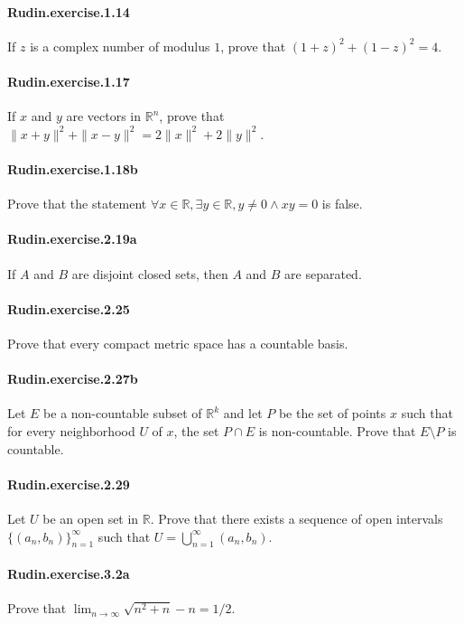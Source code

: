 \documentclass{article}
\begin{document}
\paragraph{Rudin.exercise.1.14} If $z$ is a complex number of modulus $1$, prove that $(1+z)^2+(1-z)^2=4$.

\paragraph{Rudin.exercise.1.17} If $x$ and $y$ are vectors in $\mathbb{R}^n$, prove that $\|x+y\|^2 + \|x-y\|^2 = 2\|x\|^2 + 2\|y\|^2$.

\paragraph{Rudin.exercise.1.18b} Prove that the statement $\forall x\in\mathbb{R}, \exists y\in\mathbb{R}, y\neq 0 \land xy=0$ is false.

\paragraph{Rudin.exercise.2.19a} If $A$ and $B$ are disjoint closed sets, then $A$ and $B$ are separated.

\paragraph{Rudin.exercise.2.25} Prove that every compact metric space has a countable basis.

\paragraph{Rudin.exercise.2.27b} Let $E$ be a non-countable subset of $\mathbb{R}^k$ and let $P$ be the set of points $x$ such that for every neighborhood $U$ of $x$, the set $P\cap E$ is non-countable. Prove that $E\setminus P$ is countable.

\paragraph{Rudin.exercise.2.29} Let $U$ be an open set in $\mathbb{R}$. Prove that there exists a sequence of open intervals $\{(a_n, b_n)\}_{n=1}^\infty$ such that $U=\bigcup_{n=1}^\infty (a_n, b_n)$.

\paragraph{Rudin.exercise.3.2a} Prove that $\lim_{n\to\infty} \sqrt{n^2+n} - n = 1/2$.
\end{document}
